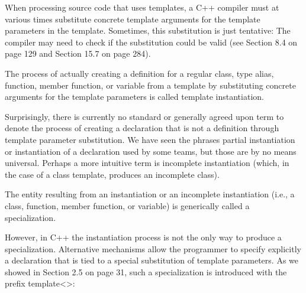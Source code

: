 When processing source code that uses templates, a C++ compiler must at various times substitute concrete template arguments for the template parameters in the template. Sometimes, this substitution is just tentative: The compiler may need to check if the substitution could be valid (see Section 8.4 on page 129 and Section 15.7 on page 284).

The process of actually creating a definition for a regular class, type alias, function, member function, or variable from a template by substituting concrete arguments for the template parameters is called template instantiation.

Surprisingly, there is currently no standard or generally agreed upon term to denote the process of creating a declaration that is not a definition through template parameter substitution. We have seen the phrases partial instantiation or instantiation of a declaration used by some teams, but those are by no means universal. Perhaps a more intuitive term is incomplete instantiation (which, in the case of a class template, produces an incomplete class).

The entity resulting from an instantiation or an incomplete instantiation (i.e., a class, function, member function, or variable) is generically called a specialization.

However, in C++ the instantiation process is not the only way to produce a specialization. Alternative mechanisms allow the programmer to specify explicitly a declaration that is tied to a special substitution of template parameters. As we showed in Section 2.5 on page 31, such a specialization is introduced with the prefix template<>: